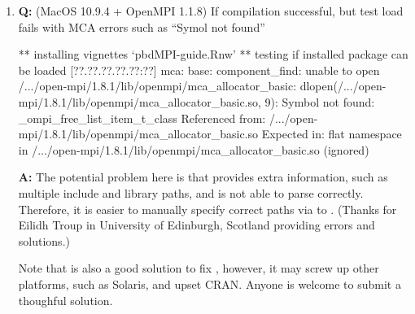 \begin{enumerate}
\item {\bf\color{blue} Q:} 
      (MacOS 10.9.4 + OpenMPI 1.1.8) If compilation successful, but test load
      fails with MCA errors such as ``Symol not found''
\begin{Error}
** installing vignettes
   `pbdMPI-guide.Rnw'
** testing if installed package can be loaded
[??.??.??.??.??:??] mca: base: component_find: unable to open
/.../open-mpi/1.8.1/lib/openmpi/mca_allocator_basic:
dlopen(/.../open-mpi/1.8.1/lib/openmpi/mca_allocator_basic.so, 9):
Symbol not found: _ompi_free_list_item_t_class
  Referenced from: /.../open-mpi/1.8.1/lib/openmpi/mca_allocator_basic.so
  Expected in: flat namespace
 in /.../open-mpi/1.8.1/lib/openmpi/mca_allocator_basic.so (ignored)
\end{Error}
      {\bf\color{blue} A:}
      The potential problem here is that  provides
      extra information, such as multiple include and library paths, and
       is not able to parse correctly. Therefore, it is
      easier to manually specify correct paths via 
      to .
      (Thanks for Eilidh Troup in University of Edinburgh, Scotland
       providing errors and solutions.)
      Note that \code{ACX_MPI} is also a good solution to fix
      \code{configure.ac}, however, it may screw up other platforms,
      such as Solaris, and upset CRAN. Anyone is welcome to submit a
      thoughful solution.



\end{enumerate}
